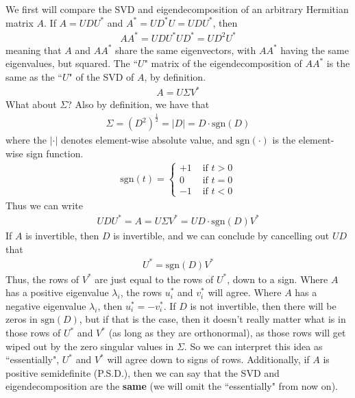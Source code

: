 \documentclass[11pt]{article}
\theoremstyle{plain}
\theoremstyle{definition}
\theoremstyle{remark}
\begin{document}
We first will compare the SVD and eigendecomposition of an arbitrary Hermitian matrix $A$. If $A = UDU^*$ and $A^* = UD^*U = UDU^*$, then
\begin{align*}
    AA^* = U D U^* U D ^* = U D^2 U^*
\end{align*}
meaning that $A$ and $AA^*$ share the same eigenvectors, with $AA^*$ having the same eigenvalues, but squared. The ``$U$" matrix of the eigendecomposition of $AA^*$ is the same as the ``$U$" of the SVD of $A$, by definition.
\begin{align*}
    A = U \Sigma V^*
\end{align*}
What about $\Sigma$? Also by definition, we have that
\begin{align*}
    \Sigma = (D^2)^{\frac{1}{2}} = |D| = D \cdot \text{sgn}(D)
\end{align*}
where the $|\cdot|$ denotes element-wise absolute value, and $\text{sgn}(\cdot)$ is the element-wise sign function. 
\begin{align*}
    \text{sgn}(t) = \begin{cases}
    +1 &\text{ if } t > 0\\
    0 &\text{ if } t = 0\\
    -1 &\text{ if } t < 0
    \end{cases}
\end{align*}
Thus we can write
\begin{align*}
    UDU^* = A = U \Sigma V^* = U D \cdot \text{sgn}(D) V^*
\end{align*}
If $A$ is invertible, then $D$ is invertible, and we can conclude by cancelling out $UD$ that
\begin{align*}
    U^* = \text{sgn}(D) V^*
\end{align*}
Thus, the rows of $V^*$ are just equal to the rows of $U^*$, down to a sign. Where $A$ has a positive eigenvalue $\lambda_i$, the rows $u_i^*$ and $v_i^*$ will agree. Where $A$ has a negative eigenvalue $\lambda_i$, then $u_i^* = -v_i^*$. If $D$ is not invertible, then there will be zeros in $\text{sgn}(D)$, but if that is the case, then it doesn't really matter what is in those rows of $U^*$ and $V^*$ (as long as they are orthonormal), as those rows will get wiped out by the zero singular values in $\Sigma$. So we can interpret this idea as ``essentially", $U^*$ and $V^*$ will agree down to signs of rows. Additionally, if $A$ is positive semidefinite (P.S.D.), then we can say that the SVD and eigendecomposition are the {\bf same} (we will omit the ``essentially" from now on).
\end{document}
